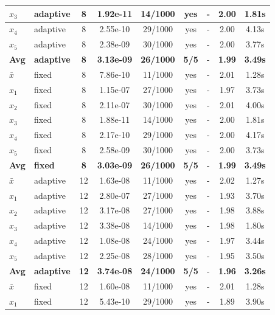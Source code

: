 \begin{longtable}{|l|l|c|c|c|c|c|c|c|}
\hline
$x_3$ & adaptive & 8 & 1.92e-11 & 14/1000 & yes & - & 2.00 & 1.81s \\
\hline
$x_4$ & adaptive & 8 & 2.55e-10 & 29/1000 & yes & - & 2.00 & 4.13s \\
\hline
$x_5$ & adaptive & 8 & 2.38e-09 & 30/1000 & yes & - & 2.00 & 3.77s \\
\hline
\hline\hline
\textbf{Avg} & \textbf{adaptive} & \textbf{8} & \textbf{3.13e-09} & \textbf{26/1000} & \textbf{5/5} & - & \textbf{1.99} & \textbf{3.49s} \\
\hline\hline
\hline
$\bar{x}$ & fixed & 8 & 7.86e-10 & 11/1000 & yes & - & 2.01 & 1.28s \\
\hline
$x_1$ & fixed & 8 & 1.15e-07 & 27/1000 & yes & - & 1.97 & 3.73s \\
\hline
$x_2$ & fixed & 8 & 2.11e-07 & 30/1000 & yes & - & 2.01 & 4.00s \\
\hline
$x_3$ & fixed & 8 & 1.88e-11 & 14/1000 & yes & - & 2.00 & 1.81s \\
\hline
$x_4$ & fixed & 8 & 2.17e-10 & 29/1000 & yes & - & 2.00 & 4.17s \\
\hline
$x_5$ & fixed & 8 & 2.58e-09 & 30/1000 & yes & - & 2.00 & 3.73s \\
\hline
\hline\hline
\textbf{Avg} & \textbf{fixed} & \textbf{8} & \textbf{3.03e-09} & \textbf{26/1000} & \textbf{5/5} & - & \textbf{1.99} & \textbf{3.49s} \\
\hline\hline
$\bar{x}$ & adaptive & 12 & 1.63e-08 & 11/1000 & yes & - & 2.02 & 1.27s \\
\hline
$x_1$ & adaptive & 12 & 2.80e-07 & 27/1000 & yes & - & 1.93 & 3.70s \\
\hline
$x_2$ & adaptive & 12 & 3.17e-08 & 27/1000 & yes & - & 1.98 & 3.88s \\
\hline
$x_3$ & adaptive & 12 & 3.38e-08 & 14/1000 & yes & - & 1.98 & 1.80s \\
\hline
$x_4$ & adaptive & 12 & 1.08e-08 & 24/1000 & yes & - & 1.97 & 3.44s \\
\hline
$x_5$ & adaptive & 12 & 2.25e-08 & 28/1000 & yes & - & 1.95 & 3.50s \\
\hline
\hline\hline
\textbf{Avg} & \textbf{adaptive} & \textbf{12} & \textbf{3.74e-08} & \textbf{24/1000} & \textbf{5/5} & - & \textbf{1.96} & \textbf{3.26s} \\
\hline\hline
\hline
$\bar{x}$ & fixed & 12 & 1.60e-08 & 11/1000 & yes & - & 2.01 & 1.28s \\
\hline
$x_1$ & fixed & 12 & 5.43e-10 & 29/1000 & yes & - & 1.89 & 3.90s \\

\end{longtable}
